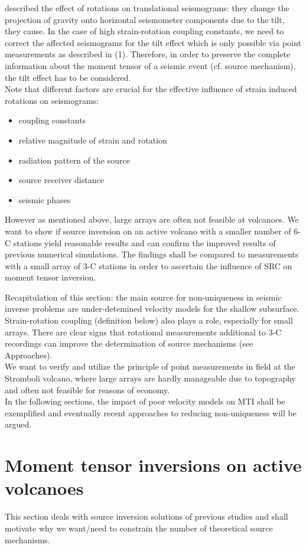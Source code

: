 \documentclass[12pt, a4paper]{article}
\begin{document}
\citet{Graizer2010} described the effect of rotations on translational seismograms: they change the projection of gravity onto horizontal seismometer components due to the tilt, they cause.  In the case of high strain-rotation coupling constants, we need to correct the affected seismograms for the tilt effect which is only possible via point measurements as described in (1). Therefore, in order to preserve the complete information about the moment tensor of a seismic event (cf. source mechanism), the tilt effect has to be considered.\\
Note that different factors are crucial for the effective influence of strain induced rotations on seismograms:
\begin{itemize}
	\singlespacing
	\item coupling constants
	\item relative magnitude of strain and rotation
	\item radiation pattern of the source
	\item source receiver distance
	\item seismic phases
\end{itemize}

However as mentioned above, large arrays are often not feasible at volcanoes. We want to show if source inversion on an active volcano with a smaller number of 6-C stations yield reasonable results and can confirm the improved results of previous numerical simulations. The findings shall be compared to measurements with a small array of 3-C stations in order to ascertain the influence of SRC on moment tensor inversion.

Recapitulation of this section: the main source for non-uniqueness in seismic inverse problems are under-detemined velocity models for the shallow subsurface. Strain-rotation coupling (definition below) also plays a role, especially for small arrays. There are clear signs that rotational measurements additional to 3-C recordings can improve the determination of source mechanisms (see Approaches).\\
We want to verify and utilize the principle of point measurements in field at the Stromboli volcano, where large arrays are hardly manageable due to topography and often not feasible for reasons of economy.\\
In the following sections, the impact of poor velocity models on MTI shall be exemplified and eventually recent approaches to reducing non-uniqueness will be argued.

\section*{Moment tensor inversions on active volcanoes}
This section deals with source inversion solutions of previous studies and shall motivate why we want/need to constrain the number of theoretical source mechanisms.\\
\end{document}
